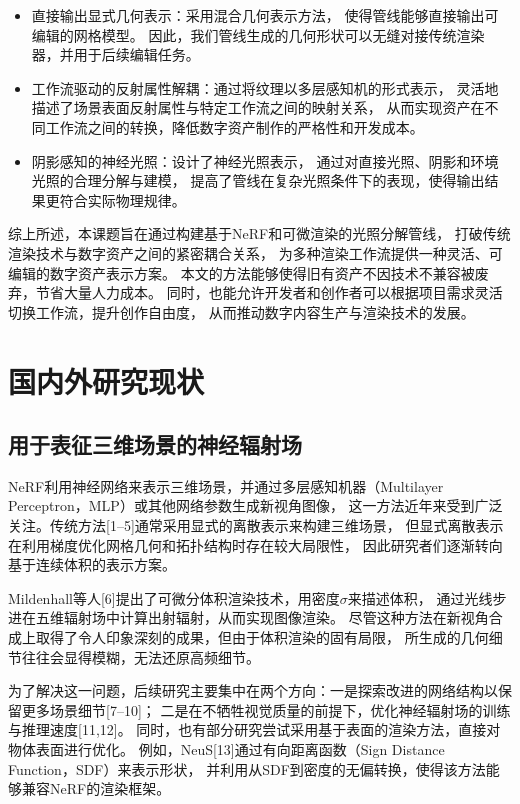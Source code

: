 \begin{itemize}
  \item 直接输出显式几何表示：采用混合几何表示方法，
  使得管线能够直接输出可编辑的网格模型。
  因此，我们管线生成的几何形状可以无缝对接传统渲染器，并用于后续编辑任务。
  \item 工作流驱动的反射属性解耦：通过将纹理以多层感知机的形式表示，
  灵活地描述了场景表面反射属性与特定工作流之间的映射关系，
  从而实现资产在不同工作流之间的转换，降低数字资产制作的严格性和开发成本。
  \item 阴影感知的神经光照：设计了神经光照表示，
  通过对直接光照、阴影和环境光照的合理分解与建模，
  提高了管线在复杂光照条件下的表现，使得输出结果更符合实际物理规律。
\end{itemize}

综上所述，本课题旨在通过构建基于NeRF和可微渲染的光照分解管线，
打破传统渲染技术与数字资产之间的紧密耦合关系，
为多种渲染工作流提供一种灵活、可编辑的数字资产表示方案。
本文的方法能够使得旧有资产不因技术不兼容被废弃，节省大量人力成本。
同时，也能允许开发者和创作者可以根据项目需求灵活切换工作流，提升创作自由度，
从而推动数字内容生产与渲染技术的发展。



\section{国内外研究现状}
\subsection{用于表征三维场景的神经辐射场}
NeRF利用神经网络来表示三维场景，并通过多层感知机器（Multilayer Perceptron，MLP）或其他网络参数生成新视角图像，
这一方法近年来受到广泛关注。传统方法[1–5]通常采用显式的离散表示来构建三维场景，
但显式离散表示在利用梯度优化网格几何和拓扑结构时存在较大局限性，
因此研究者们逐渐转向基于连续体积的表示方案。

Mildenhall等人[6]提出了可微分体积渲染技术，用密度$\sigma$来描述体积，
通过光线步进在五维辐射场中计算出射辐射，从而实现图像渲染。
尽管这种方法在新视角合成上取得了令人印象深刻的成果，但由于体积渲染的固有局限，
所生成的几何细节往往会显得模糊，无法还原高频细节。

为了解决这一问题，后续研究主要集中在两个方向：一是探索改进的网络结构以保留更多场景细节[7–10]；
二是在不牺牲视觉质量的前提下，优化神经辐射场的训练与推理速度[11,12]。
同时，也有部分研究尝试采用基于表面的渲染方法，直接对物体表面进行优化。
例如，NeuS[13]通过有向距离函数（Sign Distance Function，SDF）来表示形状，
并利用从SDF到密度的无偏转换，使得该方法能够兼容NeRF的渲染框架。

